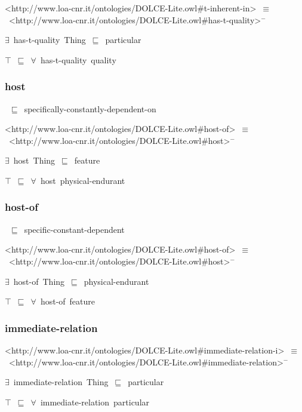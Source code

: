 \documentclass{article}
\begin{document}
<http://www.loa-cnr.it/ontologies/DOLCE-Lite.owl#t-inherent-in>~\ensuremath{\equiv}~<http://www.loa-cnr.it/ontologies/DOLCE-Lite.owl#has-t-quality>\ensuremath{^-}

\ensuremath{\exists}~has-t-quality~Thing~\ensuremath{\sqsubseteq}~particular

\ensuremath{\top}~\ensuremath{\sqsubseteq}~\ensuremath{\forall}~has-t-quality~quality

\subsubsection*{host}

~\ensuremath{\sqsubseteq}~specifically-constantly-dependent-on

<http://www.loa-cnr.it/ontologies/DOLCE-Lite.owl#host-of>~\ensuremath{\equiv}~<http://www.loa-cnr.it/ontologies/DOLCE-Lite.owl#host>\ensuremath{^-}

\ensuremath{\exists}~host~Thing~\ensuremath{\sqsubseteq}~feature

\ensuremath{\top}~\ensuremath{\sqsubseteq}~\ensuremath{\forall}~host~physical-endurant

\subsubsection*{host-of}

~\ensuremath{\sqsubseteq}~specific-constant-dependent

<http://www.loa-cnr.it/ontologies/DOLCE-Lite.owl#host-of>~\ensuremath{\equiv}~<http://www.loa-cnr.it/ontologies/DOLCE-Lite.owl#host>\ensuremath{^-}

\ensuremath{\exists}~host-of~Thing~\ensuremath{\sqsubseteq}~physical-endurant

\ensuremath{\top}~\ensuremath{\sqsubseteq}~\ensuremath{\forall}~host-of~feature

\subsubsection*{immediate-relation}

<http://www.loa-cnr.it/ontologies/DOLCE-Lite.owl#immediate-relation-i>~\ensuremath{\equiv}~<http://www.loa-cnr.it/ontologies/DOLCE-Lite.owl#immediate-relation>\ensuremath{^-}

\ensuremath{\exists}~immediate-relation~Thing~\ensuremath{\sqsubseteq}~particular

\ensuremath{\top}~\ensuremath{\sqsubseteq}~\ensuremath{\forall}~immediate-relation~particular
\end{document}
